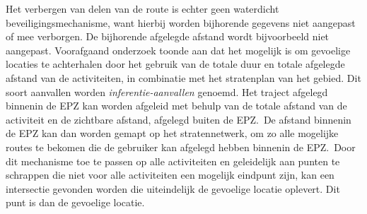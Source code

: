 Het verbergen van delen van de route is echter geen waterdicht
beveiligingsmechanisme, want hierbij worden bijhorende gegevens niet aangepast
of mee verborgen. De bijhorende afgelegde afstand wordt bijvoorbeeld niet
aangepast. Voorafgaand onderzoek toonde aan dat het mogelijk is om gevoelige
locaties te achterhalen door het gebruik van de totale duur en totale afgelegde
afstand van de activiteiten, in combinatie met het stratenplan van het gebied.
Dit soort aanvallen worden \textit{inferentie-aanvallen} genoemd. Het traject
afgelegd binnenin de EPZ kan worden afgeleid met behulp van de totale afstand
van de activiteit en de zichtbare afstand, afgelegd buiten de EPZ.\ De afstand
binnenin de EPZ kan dan worden gemapt op het stratennetwerk, om zo alle
mogelijke routes te bekomen die de gebruiker kan afgelegd hebben binnenin de
EPZ.\ Door dit mechanisme toe te passen op alle activiteiten en geleidelijk aan
punten te schrappen die niet voor alle activiteiten een mogelijk eindpunt zijn,
kan een intersectie gevonden worden die uiteindelijk de gevoelige locatie
oplevert. Dit punt is dan de gevoelige locatie.

